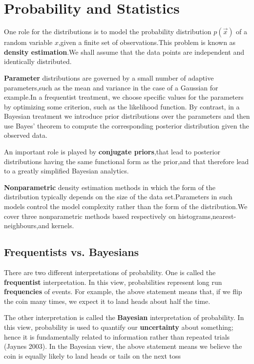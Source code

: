\chapter{Probability and Statistics}
\label{chap:Probability and Statistics}
One role for the distributions is to model the probability distribution $p(\vec{x})$ of a random variable $x$,given a finite set of observations.This problem is known as \textbf{density estimation}.We shall assume that the data points are independent and identically distributed.

\textbf{Parameter} distributions are governed by a small number of adaptive parameters,such as the mean and variance in the case of a Gaussian for example.In a frequentist treatment, we choose specific values for the parameters by optimizing some criterion, such as the likelihood function. By contrast, in a Bayesian treatment we introduce prior distributions over the parameters and then use Bayes’ theorem to compute the corresponding posterior distribution given the observed data.

An important role is played by \textbf{conjugate priors},that lead to posterior distributions having the same functional form as the prior,and that therefore lead to a greatly simplified Bayesian analytics.

\textbf{Nonparametric} density estimation methods in which the form of the distribution typically depends on the size of the data set.Parameters in such models control the model complexity rather than the form of the distribution.We cover three nonparametric methods based respectively on histograms,nearest-neighbours,and kernels.

\section{Frequentists vs. Bayesians}
There are two different interpretations of probability.
One is called the \textbf{frequentist} interpretation. In this view, probabilities represent long run \textbf{frequencies} of events. For example, the above statement means that, if we flip the coin many times, we expect it to land heads about half the time.

The other interpretation is called the \textbf{Bayesian} interpretation of probability. In this view, probability is used to quantify our \textbf{uncertainty} about something; hence it is fundamentally related to information rather than repeated trials (Jaynes 2003). In the Bayesian view, the above statement means we believe the coin is equally likely to land heads or tails on the next toss

